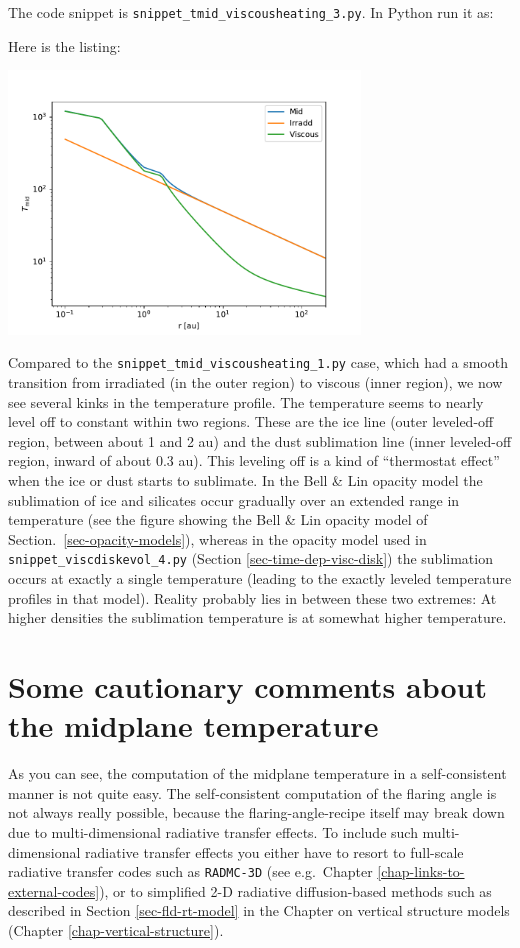 \documentclass{book}
\newcommand{\code}[1]{{\small\tt #1}}
\begin{document}
The code snippet is
\code{snippet\_tmid\_viscousheating\_3.py}. In Python run it as:
\begin{codebox}
\end{codebox}
Here is the listing:

\centerline{\includegraphics[width=0.7\textwidth]{../snippets/fig_snippet_tmid_viscousheating_3_1.pdf}}
Compared to the \code{snippet\_tmid\_viscousheating\_1.py} case,
which had a smooth transition from irradiated (in the outer region) to
viscous (inner region), we now see several kinks in the temperature
profile. The temperature seems to nearly level off to constant within
two regions. These are the ice line (outer leveled-off region, between about
1 and 2 au) and the dust sublimation line (inner leveled-off region,
inward of about 0.3 au). This leveling off
is a kind of ``thermostat effect'' when the ice or dust starts to
sublimate. In the Bell \& Lin opacity model the sublimation of ice
and silicates occur gradually over an extended range in temperature
(see the figure showing the Bell \& Lin opacity model
of Section.~\ref{sec-opacity-models}), whereas in the opacity model
used in \code{snippet\_viscdiskevol\_4.py} (Section \ref{sec-time-dep-visc-disk})
the sublimation occurs at exactly a single temperature (leading to the
exactly leveled temperature profiles in that model). Reality
probably lies in between these two extremes: At higher densities the sublimation
temperature is at somewhat higher temperature.


\section{Some cautionary comments about the midplane temperature}
\label{sec-midplane-temp-comments}
%
As you can see, the computation of the midplane temperature in a self-consistent
manner is not quite easy. The self-consistent computation of the flaring angle
is not always really possible, because the flaring-angle-recipe itself may break
down due to multi-dimensional radiative transfer effects. To include such
multi-dimensional radiative transfer effects you either have to resort to
full-scale radiative transfer codes such as \code{RADMC-3D} (see e.g.~Chapter
\ref{chap-links-to-external-codes}), or to simplified 2-D radiative diffusion-based
methods such as described in Section \ref{sec-fld-rt-model} in the Chapter on
vertical structure models (Chapter \ref{chap-vertical-structure}).
\end{document}
